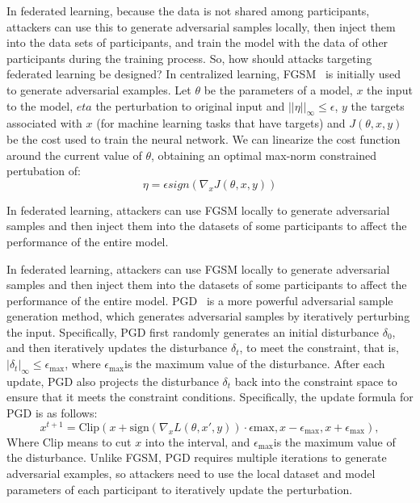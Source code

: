 \documentclass[pdflatex,sn-mathphys-num]{sn-jnl}%
\theoremstyle{thmstyleone}%
\theoremstyle{thmstyletwo}%
\theoremstyle{thmstylethree}%
\begin{document}
In federated learning, because the data is not shared
among participants, attackers can use this to generate
adversarial samples locally, then inject them into the data
sets of participants, and train the model with the data of
other participants during the training process.
So, how should attacks targeting federated learning be
designed? In centralized learning, FGSM~\cite{goodfellow2014explaining} is initially
used to generate adversarial examples. Let $\theta$ be the parameters of a model, $x$ the input to the model,
$eta$ the perturbation to original input and $||\eta||_\infty \le \epsilon$,
$y$ the targets associated with $x$ (for machine learning tasks that have targets)
and $J(\theta, x, y)$ be the cost used to train the neural network.
We can linearize the cost function around the current value of $\theta$,
obtaining an optimal max-norm constrained pertubation of:
\begin{equation}
	\eta = \epsilon sign(\nabla_x J(\theta,x,y))
\end{equation}

In federated learning, attackers can use FGSM locally to generate
adversarial samples and then inject them into the datasets of some participants
to affect the performance of the entire model.

In federated learning, attackers can use FGSM locally
to generate adversarial samples and then inject them into
the datasets of some participants to affect the performance
of the entire model. PGD~\cite{madry2017towards} is a more powerful adversarial sample
generation method, which generates adversarial samples
by iteratively perturbing the input. Specifically, PGD
first randomly generates an initial disturbance $\delta_0$,
and then iteratively updates the disturbance $\delta_t$, to meet the constraint,
that is, $|\delta_t|_{\infty} \leq \epsilon_{\text{max}}$,
where $\epsilon_{\text{max}}$is the maximum value of the disturbance.
After each update, PGD also projects the disturbance
$\delta_t$ back into the constraint space to ensure that it meets the
constraint conditions.
Specifically, the update formula for PGD is as follows:
\begin{equation}
	x^{t+1} = \text{Clip}(x + \text{sign}(\nabla_x L(\theta,x',y)) \cdot \epsilon{\text{max}}, x - \epsilon_{\text{max}}, x + \epsilon_{\text{max}}),
\end{equation}
Where $\text{Clip}$ means to cut $x$ into the interval, and $\epsilon_ {\text{max}} $is the maximum value of the disturbance.
Unlike FGSM, PGD requires multiple iterations to generate adversarial examples,
so attackers need to use the local dataset and model parameters of each participant
to iteratively update the perturbation.
\end{document}
